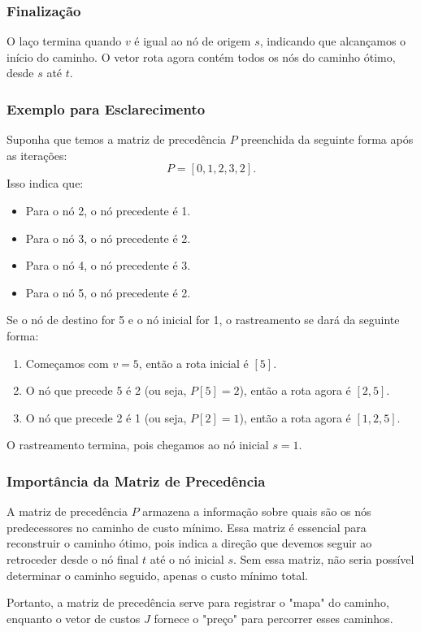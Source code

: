 \documentclass{article}
\begin{document}
\subsubsection*{Finalização}
O laço termina quando \( v \) é igual ao nó de origem \( s \), indicando que alcançamos o início do caminho. O vetor \( \text{rota} \) agora contém todos os nós do caminho ótimo, desde \( s \) até \( t \).

\subsubsection*{Exemplo para Esclarecimento}
Suponha que temos a matriz de precedência \( P \) preenchida da seguinte forma após as iterações:
\[
P = [0, 1, 2, 3, 2].
\]
Isso indica que:
\begin{itemize}
    \item Para o nó 2, o nó precedente é 1.
    \item Para o nó 3, o nó precedente é 2.
    \item Para o nó 4, o nó precedente é 3.
    \item Para o nó 5, o nó precedente é 2.
\end{itemize}

Se o nó de destino for 5 e o nó inicial for 1, o rastreamento se dará da seguinte forma:
\begin{enumerate}
    \item Começamos com \( v = 5 \), então a rota inicial é \( [5] \).
    \item O nó que precede 5 é 2 (ou seja, \( P[5] = 2 \)), então a rota agora é \( [2, 5] \).
    \item O nó que precede 2 é 1 (ou seja, \( P[2] = 1 \)), então a rota agora é \( [1, 2, 5] \).
\end{enumerate}
O rastreamento termina, pois chegamos ao nó inicial \( s = 1 \).

\subsubsection*{Importância da Matriz de Precedência}
A matriz de precedência \( P \) armazena a informação sobre quais são os nós predecessores no caminho de custo mínimo. Essa matriz é essencial para reconstruir o caminho ótimo, pois indica a direção que devemos seguir ao retroceder desde o nó final \( t \) até o nó inicial \( s \). Sem essa matriz, não seria possível determinar o caminho seguido, apenas o custo mínimo total.

Portanto, a matriz de precedência serve para registrar o "mapa" do caminho, enquanto o vetor de custos \( J \) fornece o "preço" para percorrer esses caminhos.
\end{document}
